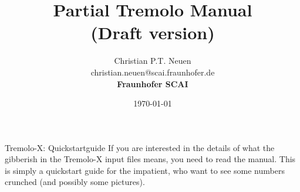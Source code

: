 \documentclass[a4paper, 11pt]{report}
\date{\today}
\title{Partial Tremolo Manual\\ (Draft version)}
\author{Christian P.T. Neuen\\christian.neuen@scai.fraunhofer.de\\{\Large{}\bf Fraunhofer SCAI}}
\begin{document}
{\huge Tremolo-X: Quickstartguide}
\bigbreak
{\small If you are interested in the details of what the gibberish in the Tremolo-X input files means, you need to read the manual. 
This is simply a quickstart guide for the impatient, who want to see some numbers crunched (and possibly some pictures).}
\bigbreak







%
%







\end{document}
